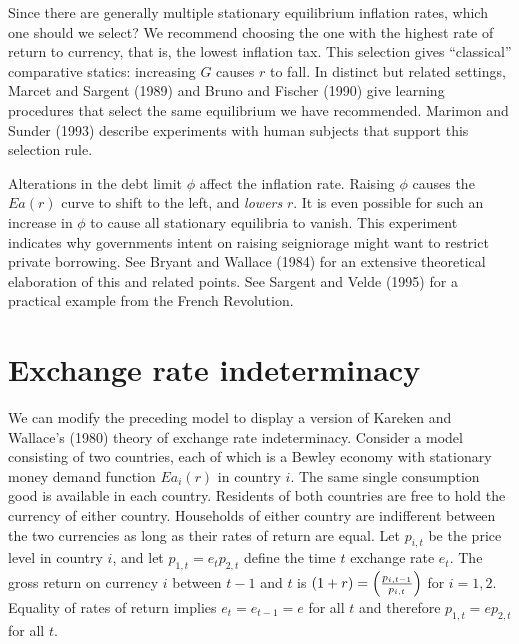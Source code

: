   Since there are generally multiple stationary equilibrium inflation
rates, which one should we select?  We recommend choosing
the one with the highest rate of return to currency, that is, the
lowest inflation tax.  This selection gives
``classical'' comparative statics: increasing $G$ causes $r$ to fall.
In  distinct but related settings, Marcet and Sargent (1989) and
Bruno and Fischer (1990) give learning procedures that select
the same equilibrium we have recommended.  Marimon and
Sunder (1993) describe experiments with human subjects
that  support this selection rule.

  Alterations in the debt limit $\phi$ affect the
inflation rate.  Raising $\phi$ causes the $E a(r)$ curve to
shift to the left, and {\it  lowers\/} $r$.  It is even possible
for such an increase in $\phi$ to cause all stationary equilibria
to vanish.  This experiment indicates why
governments intent on raising seigniorage might want to restrict
private borrowing.  See Bryant and Wallace (1984) for an
extensive theoretical elaboration of this and related points.
See Sargent and Velde (1995) for a practical example from the
French Revolution.
\section{Exchange rate indeterminacy}

We can modify the preceding model to display a version of Kareken
and Wallace's (1980) %
 theory of exchange rate indeterminacy.
Consider a model consisting of two countries, each of which  is
a Bewley economy with stationary money demand function
$E a_i(r)$ in country $i$. The same single  consumption
good is available in each country.  Residents of both countries
are free to hold the currency of either country.  Households
of either country are indifferent between the two currencies as long
as their rates of return are equal.  Let $p_{i,t}$ be the price
level in country $i$, and let $p_{1,t} = e_t p_{2,t}$ define
the time $t$ exchange rate $e_t$.  The gross return on
currency $i$ between $t-1$ and $t$ is $(1+r) = \left({p_{i,t-1}
\over p_{i,t}}\right)$ for $i=1,2$.
Equality of rates of return implies $e_t = e_{t-1} =e$ for all
$t$ and therefore
$ p_{1,t} = e p_{2,t}$ for all $t$.


